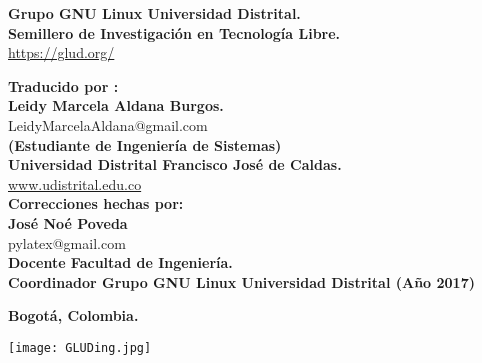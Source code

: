 \begin{center}

\textbf{Grupo GNU Linux Universidad Distrital. \\
Semillero de Investigación en Tecnología Libre.} \\
\url{https://glud.org/}

\vspace{0.6cm}

\textbf{Traducido por : \\
Leidy Marcela Aldana Burgos. \\}
LeidyMarcelaAldana@gmail.com \\
\textbf{(Estudiante de Ingeniería de Sistemas)} \\

\vspace{0.6cm}
\textbf{Universidad Distrital Francisco José de Caldas.} \\
\url{www.udistrital.edu.co}  \\
\vspace{0.6cm}
\textbf{Correcciones hechas por:\\ José Noé Poveda}\\pylatex@gmail.com\\\textbf{Docente Facultad de Ingeniería.\\Coordinador Grupo GNU Linux Universidad Distrital (Año 2017)}

\vspace{0.6cm}

\textbf{Bogotá, Colombia.}

\vspace{0.9cm}

\texttt{[image: GLUDing.jpg]}

\end{center}

\newpage
